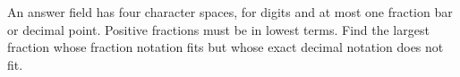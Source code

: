 An answer field has four character spaces, for digits and at most one fraction bar or decimal point. Positive fractions must be in lowest terms. Find the largest fraction whose fraction notation fits but whose exact decimal notation does not fit.
